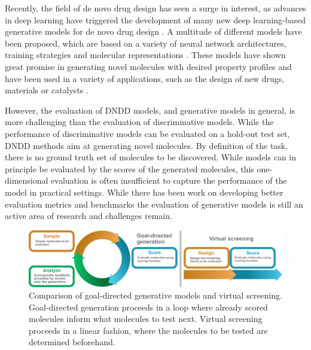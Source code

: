Recently, the field of de novo drug design has seen a surge in interest, as advances in deep learning
have triggered the development of many new deep learning-based generative models for de novo drug
design \citep{eltonDeepLearningMolecular2019}. A multitude of different models have been proposed,
which are based on a variety of neural network architectures, training strategies and molecular
representations \citep{eltonDeepLearningMolecular2019,sanchez-lengelingInverseMolecularDesign2018}.
These models have shown great promise in generating novel molecules with desired property profiles
and have been used in a variety of applications, such as the design of new drugs, materials or
catalysts \citep{todo}.

However, the evaluation of \ac{DNDD} models, and generative models in general, is more challenging
than the evaluation of discriminative models. While the performance of discriminative models can be
evaluated on a hold-out test set, \ac{DNDD} methods aim at generating novel molecules. By definition
of the task, there is no ground truth set of molecules to be discovered. While models
can in principle be evaluated by the scores of the generated molecules, this one-dimensional
evaluation is often insufficient to capture the performance of the model in practical settings.
While there has been work on developing better evaluation metrics and benchmarks
\citep{brownGuacaMolBenchmarkingModels2019,polykovskiyMolecularSetsMOSES2020,thomasComparisonStructureLigandbased2021,gaoSampleEfficiencyMatters2022,trippFreshLookNovo}
the evaluation of generative models is still an active area of research and challenges remain.

\begin{figure}
      \centering
      \includegraphics[width=\textwidth]{./figures/goal_directed_cycle_and_virtual_screening.pdf}
      \caption{Comparison of goal-directed generative models and virtual screening. Goal-directed
            generation proceeds in a loop where already scored molecules inform what molecules to test next.
            Virtual screening proceeds in a linear fashion, where the molecules to be tested are determined
            beforehand. }
\end{figure}

